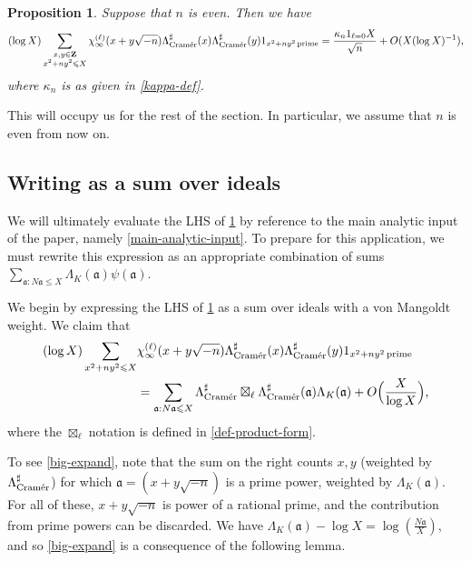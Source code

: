\documentclass[11pt,reqno]{amsart}
\numberwithin{equation}{section}
\newtheorem{proposition}[theorem]{Proposition}
\theoremstyle{definition}
\theoremstyle{remark}
\newcommand{\mf}{\mathfrak}
\renewcommand{\le}{\leqslant}
\newcommand\Z{\mathbf{Z}}
\newcommand\cramer{{\textnormal{Cram\'er}}}
\begin{document}
\begin{proposition}\label{main-term-sharps} Suppose that $n$ is even. Then we have
\[ 
(\log X) \sum_{\substack{x,y \in \Z \\ x^2 + ny^2 \le X}} \chi_{\infty}^{(\ell)}(x + y \sqrt{-n})\Lambda^{\sharp}_{\cramer}(x)\Lambda^{\sharp}_{\cramer}(y) 1_{x^2 + ny^2 \operatorname{prime}} =\frac{\kappa_n 1_{\ell = 0} X}{\sqrt{n}}  + O(X (\log X)^{-1}),\]
where $\kappa_n$ is as given in \cref{kappa-def}.\end{proposition}

This will occupy us for the rest of the section. In particular, we assume that $n$ is even from now on.

\subsection{Writing as a sum over ideals}

We will ultimately evaluate the LHS of \cref{main-term-sharps} by reference to the main analytic input of the paper, namely \cref{main-analytic-input}. To prepare for this application, we must rewrite this expression as an appropriate combination of sums $\sum_{\mf{a}: N\mf{a} \le X} \Lambda_K(\mf{a}) \psi(\mf{a})$. 

We begin by expressing the LHS of \cref{main-term-sharps} as a sum over ideals with a von Mangoldt weight. We claim that 
\begin{align}\nonumber(\log X)\sum_{x^2 + ny^2\le X}
& \chi_{\infty}^{(\ell)}(x + y \sqrt{-n})\Lambda^{\sharp}_{\cramer}(x)\Lambda^{\sharp}_{\cramer}(y) 1_{x^2 + ny^2 \operatorname{prime}} \\ & = \sum_{\mf{a} : N\mf{a} \le X}  \Lambda_{\cramer}^{\sharp}\boxtimes_{\ell} \Lambda_{\cramer}^{\sharp}(\mf{a}) \Lambda_K(\mf{a}) + O\Big(\frac{X}{\log X}\Big), \label{big-expand} \end{align} where the $\boxtimes_{\ell}$ notation is defined in \cref{def-product-form}.

To see \cref{big-expand}, note that the sum on the right counts $x,y$ (weighted by $\Lambda_{\cramer}^{\sharp}$) for which $\mf{a} = (x + y \sqrt{-n})$ is a prime power, weighted by $\Lambda_K(\mf{a})$. For all of these, $x + y \sqrt{-n}$ is power of a rational prime, and the contribution from prime powers can be discarded. We have $\Lambda_K(\mf{a}) - \log X = \log (\frac{N\mf{a}}{X})$, and so \cref{big-expand} is a consequence of the following lemma.
\end{document}
